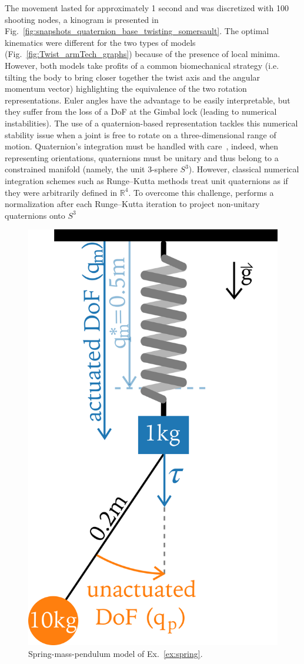 The movement lasted for approximately 1 second and was discretized with 100 shooting nodes, a kinogram is presented in Fig.~\ref{fig:snapshots_quaternion_base_twisting_somersault}.
The optimal kinematics were different for the two types of models (Fig.~\ref{fig:Twist_armTech_graphs}) because of the presence of local minima.
However, both models take profits of a common biomechanical strategy (i.e. tilting the body to bring closer together the twist axis and the angular momentum vector) highlighting the equivalence of the two rotation representations.
Euler angles have the advantage to be easily interpretable, but they suffer from the loss of a DoF at the Gimbal lock (leading to numerical instabilities).
The use of a quaternion-based representation tackles this numerical stability issue when a joint is free to rotate on a three-dimensional range of motion.
Quaternion's integration must be handled with care~\cite{bailly2020optimal}, indeed, when representing orientations, quaternions must be unitary and thus belong to a constrained manifold (namely, the unit 3-sphere $S^3$). 
However, classical numerical integration schemes such as Runge–Kutta methods treat unit quaternions as if they were arbitrarily defined in $\mathbb{R}^4$.
To overcome this challenge, \bioptim performs a normalization after each Runge–Kutta iteration to project non-unitary quaternions onto $S^3$

\begin{figure}[t!]
\centering
\includegraphics[width=0.35\columnwidth]{figures/Mass_Pendulum_Model_2.png}
\caption{Spring-mass-pendulum model of Ex.~\ref{ex:spring}.}
\label{fig:Mass_Pendulum_Model}
\end{figure}

